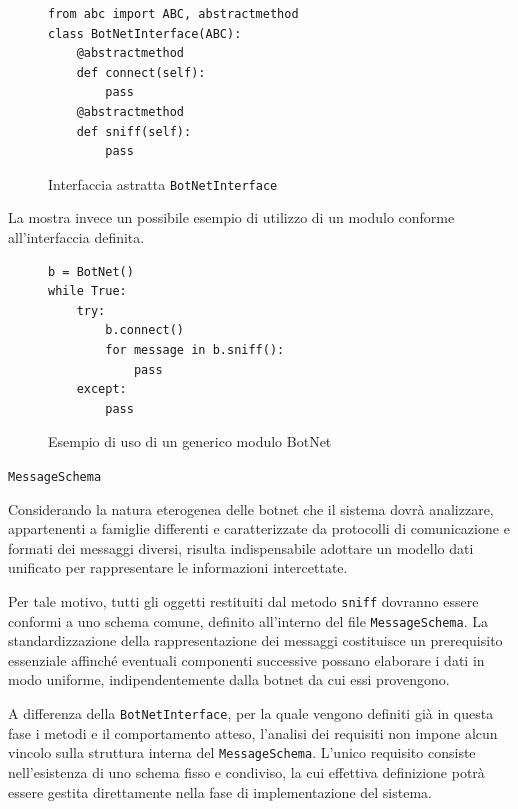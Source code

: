 \begin{description}
    \begin{figure}[ht]
        \centering
        \begin{minipage}{0.5\linewidth}
            \begin{lstlisting}[frame=single]
from abc import ABC, abstractmethod
class BotNetInterface(ABC):
    @abstractmethod
    def connect(self):
        pass
    @abstractmethod
    def sniff(self):
        pass
            \end{lstlisting}
        \end{minipage}
        \caption{Interfaccia astratta \texttt{BotNetInterface}}
        \label{fig:botnet_interface}
    \end{figure}
    
    La  mostra invece un possibile esempio di utilizzo di un modulo conforme all'interfaccia definita.

    \begin{figure}[ht]
        \centering
        \begin{minipage}{0.5\linewidth}
            \begin{lstlisting}[frame=single]
b = BotNet()
while True:
    try:
        b.connect()
        for message in b.sniff():
            pass
    except:
        pass
            \end{lstlisting}
        \end{minipage}
        \caption{Esempio di uso di un generico modulo BotNet}
        \label{fig:botnet_main}
    \end{figure}

    \item[\textbf{Schema dei messaggi}] \hspace{1em} \texttt{MessageSchema}
    
    Considerando la natura eterogenea delle botnet che il sistema dovrà analizzare, appartenenti a famiglie differenti e caratterizzate da protocolli di comunicazione e formati dei messaggi diversi, risulta indispensabile adottare un modello dati unificato per rappresentare le informazioni intercettate. 
    
    Per tale motivo, tutti gli oggetti restituiti dal metodo \texttt{sniff} dovranno essere conformi a uno schema comune, definito all'interno del file \texttt{MessageSchema}. La standardizzazione della rappresentazione dei messaggi costituisce un prerequisito essenziale affinché eventuali componenti successive possano elaborare i dati in modo uniforme, indipendentemente dalla botnet da cui essi provengono. %

    A differenza della \texttt{BotNetInterface}, per la quale vengono definiti già in questa fase i metodi e il comportamento atteso, l'analisi dei requisiti non impone alcun vincolo sulla struttura interna del \texttt{MessageSchema}. L'unico requisito consiste nell'esistenza di uno schema fisso e condiviso, la cui effettiva definizione potrà essere gestita direttamente nella fase di implementazione del sistema.
\end{description}

